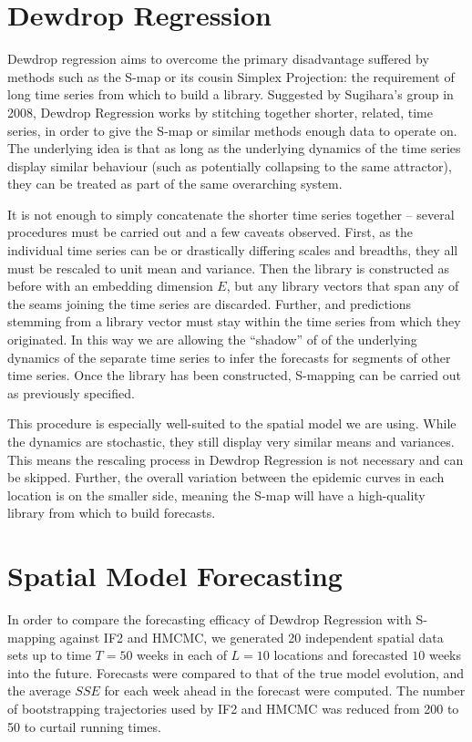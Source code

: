 \section{Dewdrop Regression}

	Dewdrop regression \cite{Hsieh2008} aims to overcome the primary disadvantage suffered by methods such as the S-map or its cousin Simplex Projection: the requirement of long time series from which to build a library. Suggested by Sugihara's group in 2008, Dewdrop Regression works by stitching together shorter, related, time series, in order to give the S-map or similar methods  enough data to operate on. The underlying idea is that as long as the underlying dynamics of the time series display similar behaviour (such as potentially collapsing to the same attractor), they can be treated as part of the same overarching system.

	It is not enough to simply concatenate the shorter time series together -- several procedures must be carried out and a few caveats observed. First, as the individual time series can be or drastically differing scales and breadths, they all must be rescaled to unit mean and variance. Then the library is constructed as before with an embedding dimension $E$, but any library vectors that span any of the seams joining the time series are discarded. Further, and predictions stemming from a library vector must stay within the time series from which they originated. In this way we are allowing the ``shadow'' of of the underlying dynamics of the separate time series to infer the forecasts for segments of other time series. Once the library has been constructed, S-mapping can be carried out as previously specified.

	This procedure is especially well-suited to the spatial model we are using. While the dynamics are stochastic, they still display very similar means and variances. This means the rescaling process in Dewdrop Regression is not necessary and can be skipped. Further, the overall variation between the epidemic curves in each location is on the smaller side, meaning the S-map will have a high-quality library from which to build forecasts.


\section{Spatial Model Forecasting}

	In order to compare the forecasting efficacy of Dewdrop Regression with S-mapping against IF2 and HMCMC, we generated 20 independent spatial data sets up to time $T = 50$ weeks in each of $L = 10$ locations and forecasted $10$ weeks into the future. Forecasts were compared to that of the true model evolution, and the average $SSE$ for each week ahead in the forecast were computed. The number of bootstrapping trajectories used by IF2 and HMCMC was reduced from 200 to 50 to curtail running times.

